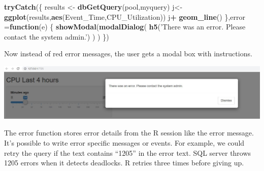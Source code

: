 \documentclass[]{article}
\newenvironment{Shaded}{\begin{snugshade}}{\end{snugshade}}
\newcommand{\ControlFlowTok}[1]{\textcolor[rgb]{0.13,0.29,0.53}{\textbf{#1}}}
\newcommand{\DataTypeTok}[1]{\textcolor[rgb]{0.13,0.29,0.53}{#1}}
\newcommand{\DecValTok}[1]{\textcolor[rgb]{0.00,0.00,0.81}{#1}}
\newcommand{\KeywordTok}[1]{\textcolor[rgb]{0.13,0.29,0.53}{\textbf{#1}}}
\newcommand{\NormalTok}[1]{#1}
\newcommand{\OperatorTok}[1]{\textcolor[rgb]{0.81,0.36,0.00}{\textbf{#1}}}
\newcommand{\StringTok}[1]{\textcolor[rgb]{0.31,0.60,0.02}{#1}}
\begin{document}
\begin{Shaded}
\begin{Highlighting}[]
      \KeywordTok{tryCatch}\NormalTok{(\{}
\NormalTok{        results <-}\StringTok{ }\KeywordTok{dbGetQuery}\NormalTok{(pool,myquery)}
\NormalTok{        j<-}\StringTok{ }\KeywordTok{ggplot}\NormalTok{(results,}\KeywordTok{aes}\NormalTok{(Event_Time,CPU_Utilization))}
\NormalTok{        j}\OperatorTok{+}\StringTok{ }\KeywordTok{geom_line}\NormalTok{()}
\NormalTok{        \},}\DataTypeTok{error =}\ControlFlowTok{function}\NormalTok{(e) \{}
            \KeywordTok{showModal}\NormalTok{(}\KeywordTok{modalDialog}\NormalTok{(}
                \KeywordTok{h5}\NormalTok{(}\StringTok{'There was an error.  Please contact the system admin.'}\NormalTok{)}
\NormalTok{            )}
\NormalTok{            )}
\NormalTok{        \})}
\end{Highlighting}
\end{Shaded}

Now instead of red error messages, the user gets a modal box with
instructions.

\includegraphics{./Images/ModalError.JPG}

The error function stores error details from the R session like the
error message. It's possible to write error specific messages or events.
For example, we could retry the query if the text contains ``1205'' in
the error text. SQL server throws 1205 errors when it detects deadlocks.
R retries three times before giving up.

\begin{Shaded}
\end{Shaded}
\end{document}
